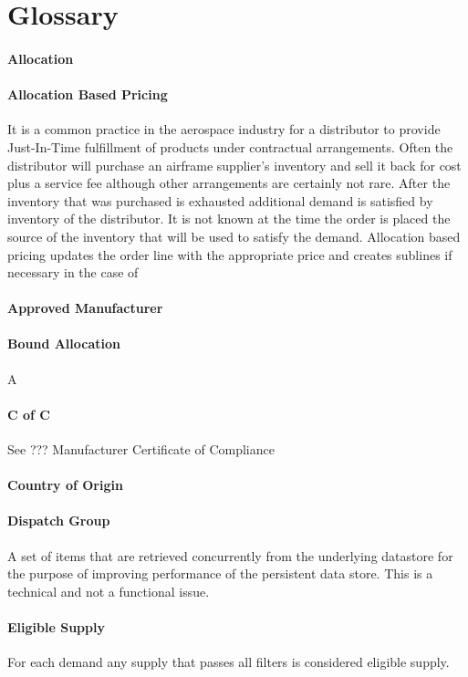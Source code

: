 \section{Glossary}
\paragraph{Allocation}
\paragraph{Allocation Based Pricing} It is a common practice in the aerospace industry for a distributor to provide
Just-In-Time fulfillment of products under contractual arrangements.  Often the distributor will purchase 
an airframe supplier's inventory and sell it back for cost plus a service fee although other arrangements are
certainly not rare.  After the inventory that was purchased is exhausted additional demand is satisfied by
inventory of the distributor.  It is not known at the time the order is placed the source of the inventory 
that will be used to satisfy the demand.  Allocation based pricing updates the order line with the appropriate price
and creates sublines if necessary in the case of 
\paragraph{Approved Manufacturer}
\paragraph{Bound Allocation}
A
\paragraph{C of C}
See ??? Manufacturer Certificate of Compliance
\paragraph{Country of Origin}
\paragraph{Dispatch Group}
A set of items that are retrieved concurrently from the underlying datastore for the purpose of improving 
performance of the persistent data store.  This is a technical and not a functional issue.
\paragraph{Eligible Supply}
For each demand any supply that passes all filters is considered eligible supply.
